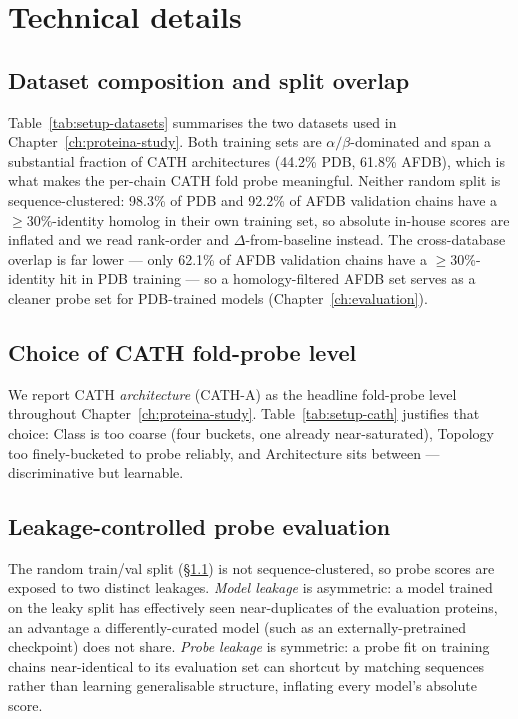 \documentclass[12pt,a4paper,twoside]{report}
\begin{document}
\appendix

\chapter{Technical details}
\label{ch:appendix}



\section{Dataset composition and split overlap}
\label{app:datasets}

Table~\ref{tab:setup-datasets} summarises the two datasets used in Chapter~\ref{ch:proteina-study}. Both training sets are $\alpha/\beta$-dominated and span a substantial fraction of CATH architectures (44.2\% PDB, 61.8\% AFDB), which is what makes the per-chain CATH fold probe meaningful. Neither random split is sequence-clustered: 98.3\% of PDB and 92.2\% of AFDB validation chains have a $\ge$30\%-identity homolog in their own training set, so absolute in-house scores are inflated and we read rank-order and $\Delta$-from-baseline instead. The cross-database overlap is far lower --- only 62.1\% of AFDB validation chains have a $\ge$30\%-identity hit in PDB training --- so a homology-filtered AFDB set serves as a cleaner probe set for PDB-trained models (Chapter~\ref{ch:evaluation}).



\section{Choice of CATH fold-probe level}
\label{app:cath}

We report CATH \emph{architecture} (CATH-A) as the headline fold-probe level throughout Chapter~\ref{ch:proteina-study}. Table~\ref{tab:setup-cath} justifies that choice: Class is too coarse (four buckets, one already near-saturated), Topology too finely-bucketed to probe reliably, and Architecture sits between --- discriminative but learnable.



\section{Leakage-controlled probe evaluation}
\label{app:leakage}

The random train/val split (\S\ref{app:datasets}) is not sequence-clustered, so probe scores are exposed to two distinct leakages. \emph{Model leakage} is asymmetric: a model trained on the leaky split has effectively seen near-duplicates of the evaluation proteins, an advantage a differently-curated model (such as an externally-pretrained checkpoint) does not share. \emph{Probe leakage} is symmetric: a probe fit on training chains near-identical to its evaluation set can shortcut by matching sequences rather than learning generalisable structure, inflating every model's absolute score.
\end{document}
